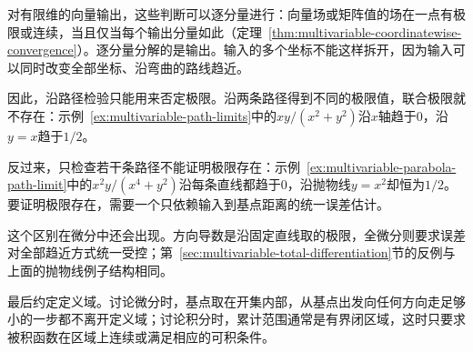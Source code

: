 对有限维的向量输出，这些判断可以逐分量进行：向量场或矩阵值的场在一点有极限或连续，当且仅当每个输出分量如此（定理~\ref{thm:multivariable-coordinatewise-convergence}）。逐分量分解的是输出。输入的多个坐标不能这样拆开，因为输入可以同时改变全部坐标、沿弯曲的路线趋近。

因此，沿路径检验只能用来否定极限。沿两条路径得到不同的极限值，联合极限就不存在：示例~\ref{ex:multivariable-path-limits}中的$xy/(x^2+y^2)$沿$x$轴趋于$0$，沿$y=x$趋于$1/2$。

反过来，只检查若干条路径不能证明极限存在：示例~\ref{ex:multivariable-parabola-path-limit}中的$x^2y/(x^4+y^2)$沿每条直线都趋于$0$，沿抛物线$y=x^2$却恒为$1/2$。要证明极限存在，需要一个只依赖输入到基点距离的统一误差估计。

这个区别在微分中还会出现。方向导数是沿固定直线取的极限，全微分则要求误差对全部趋近方式统一受控；第~\ref{sec:multivariable-total-differentiation}节的反例与上面的抛物线例子结构相同。

最后约定定义域。讨论微分时，基点取在开集内部，从基点出发向任何方向走足够小的一步都不离开定义域；讨论积分时，累计范围通常是有界闭区域，这时只要求被积函数在区域上连续或满足相应的可积条件。

